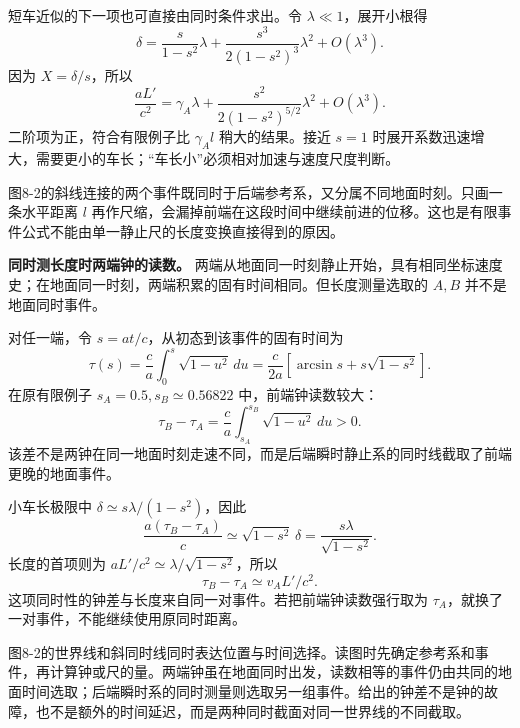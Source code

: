 \documentclass[12pt,a4paper,UTF8]{ctexart}
\begin{document}
短车近似的下一项也可直接由同时条件求出。令 \(\lambda\ll1\)，展开小根得
\[
\delta=\frac{s}{1-s^2}\lambda+
\frac{s^3}{2(1-s^2)^3}\lambda^2+O(\lambda^3).
\] 因为 \(X=\delta/s\)，所以 \[
\frac{aL'}{c^2}=\gamma_A\lambda+
\frac{s^2}{2(1-s^2)^{5/2}}\lambda^2+O(\lambda^3).
\] 二阶项为正，符合有限例子比 \(\gamma_A l\) 稍大的结果。接近 \(s=1\)
时展开系数迅速增大，需要更小的车长；``车长小''必须相对加速与速度尺度判断。

图8-2的斜线连接的两个事件既同时于后端参考系，又分属不同地面时刻。只画一条水平距离
\(l\)
再作尺缩，会漏掉前端在这段时间中继续前进的位移。这也是有限事件公式不能由单一静止尺的长度变换直接得到的原因。

\textbf{同时测长度时两端钟的读数。}
两端从地面同一时刻静止开始，具有相同坐标速度史；在地面同一时刻，两端积累的固有时间相同。但长度测量选取的
\(A,B\) 并不是地面同时事件。

对任一端，令 \(s=at/c\)，从初态到该事件的固有时间为 \[
\tau(s)=\frac ca\int_0^s\sqrt{1-u^2}\,du
=\frac{c}{2a}[\arcsin s+s\sqrt{1-s^2}].
\] 在原有限例子 \(s_A=0.5,s_B\simeq0.56822\) 中，前端钟读数较大： \[
\tau_B-\tau_A=\frac ca\int_{s_A}^{s_B}\sqrt{1-u^2}\,du>0.
\]
该差不是两钟在同一地面时刻走速不同，而是后端瞬时静止系的同时线截取了前端更晚的地面事件。

小车长极限中 \(\delta\simeq s\lambda/(1-s^2)\)，因此 \[
\frac{a(\tau_B-\tau_A)}c
\simeq\sqrt{1-s^2}\,\delta
=\frac{s\lambda}{\sqrt{1-s^2}}.
\] 长度的首项则为 \(aL'/c^2\simeq\lambda/\sqrt{1-s^2}\)，所以 \[
\tau_B-\tau_A\simeq v_A L'/c^2.
\] 这项同时性的钟差与长度来自同一对事件。若把前端钟读数强行取为
\(\tau_A\)，就换了一对事件，不能继续使用原同时距离。

图8-2的世界线和斜同时线同时表达位置与时间选择。读图时先确定参考系和事件，再计算钟或尺的量。两端钟虽在地面同时出发，读数相等的事件仍由共同的地面时间选取；后端瞬时系的同时测量则选取另一组事件。给出的钟差不是钟的故障，也不是额外的时间延迟，而是两种同时截面对同一世界线的不同截取。
\end{document}

